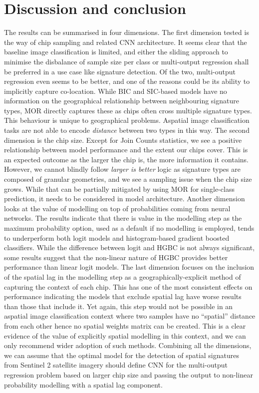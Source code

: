 \section{Discussion and conclusion} %
\label{sec:discussion}

The results can be summarised in four dimensions.
The first dimension tested is the way of chip sampling and related CNN architecture.
It seems clear that the baseline image classification is limited, and either the
sliding approach to minimise the disbalance of sample size per class or multi-output
regression shall be preferred in a use case like signature detection. Of the two,
multi-output regression even seems to be better, and one of the reasons could be its
ability to implicitly capture co-location. While BIC and SIC-based models have no
information on
the geographical relationship between neighbouring signature types, MOR directly
captures these as chips often cross multiple signature types. This behaviour is unique
to geographical problems. Aspatial image classification tasks are not able to encode
\textit{distance} between two types in this way.
The second dimension is the chip size. Except for Join Counts statistics, we see a positive
relationship between model performance and the extent our chips cover. This is an expected
outcome as the larger the chip is, the more information it contains. However, we cannot
blindly follow \textit{larger is better} logic as signature types are composed of
granular geometries, and we see a sampling issue when the chip size grows. While that
can be partially mitigated by using MOR for single-class prediction, it needs to be considered in model
architecture.
Another dimension looks at the value of modelling on top of probabilities coming from
neural networks. The results indicate that there is value in the modelling step as the
maximum probability option, used as a default if no modelling is employed, tends to
underperform both logit models and histogram-based gradient
boosted classifiers. While the difference between logit and HGBC is not always
significant, some results suggest that the non-linear nature of HGBC provides better
performance than linear logit models.
The last dimension focuses on the inclusion of the spatial lag in the modelling step as a
geographically-explicit method of capturing the context of each chip. This has one of
the most consistent effects on performance indicating the models that exclude spatial lag have worse
results than those that include it. Yet again, this step would not be possible in an
aspatial image classification context where two samples have no ``spatial'' distance from each
other hence no spatial weights matrix can be created. This is a clear evidence of the value
of explicitly spatial modelling in this context, and we can only recommend wider adoption of such methods.
Combining all the dimensions, we can assume that the optimal model for the detection of spatial
signatures from Sentinel 2 satellite imagery should define CNN for the multi-output
regression problem based on larger chip size and passing the output to non-linear
probability modelling with a spatial lag component.

